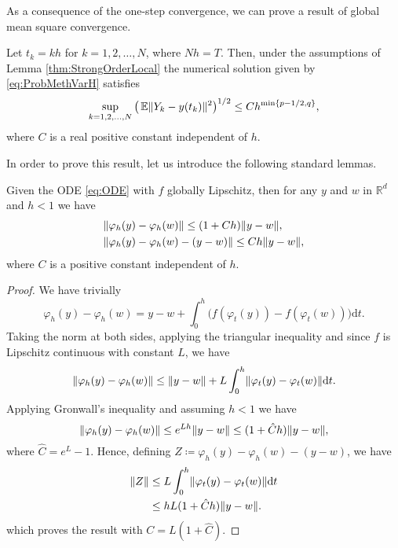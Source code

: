 \documentclass{siamart1116}
\numberwithin{theorem}{section}
\DeclarePairedDelimiter{\norm}{\|}{\|}
\renewcommand{\phi}{\varphi}
\newcommand{\R}{\mathbb{R}}
\newcommand{\defeq}{\coloneqq}
\newcommand{\E}{\operatorname{\mathbb{E}}}
\newcommand{\dd}{\mathrm{d}}
\newcommand{\corr}[1]{{\color{bordeaux}#1}}
\begin{document}
As a consequence of the one-step convergence, we can prove a result of global mean square convergence.
\begin{theorem}\label{thm:StrongOrder} Let $t_k = kh$ for $k = 1, 2, \ldots, N$, where $Nh = T$. Then, under the assumptions of Lemma \ref{thm:StrongOrderLocal} the numerical solution given by \eqref{eq:ProbMethVarH} satisfies 
	\corr{\begin{equation}\label{eq:StrongGlobalClaim}
		\sup_{k=1,2, \ldots, N} \big(\E\norm{Y_k - y(t_k)}^2\big)^{1/2} \leq C h^{\min\{p-1/2, q\}},
	\end{equation}}
	where $C$ is a real positive constant independent of $h$. 
\end{theorem}
In order to prove this result, let us introduce the following standard lemmas.
\corr{\begin{lemma}\label{lem:ODERepresentation} Given the ODE \eqref{eq:ODE} with $f$ globally Lipschitz, then for any $y$ and $w$ in $\R^d$ and $h < 1$ we have
	\begin{align}
		&\norm{\phi_h(y) - \phi_h(w)} \leq (1 + Ch) \norm{y - w},\\
		&\norm{\phi_h(y) - \phi_h(w) - (y - w)} \leq Ch\norm{y - w},
	\end{align}
	where $C$ is a positive constant independent of $h$.
\end{lemma}}
\begin{proof} We have trivially
	\begin{equation}
		\phi_h(y) - \phi_h(w) = y - w + \int_{0}^{h}\big(f(\phi_t(y)) - f(\phi_t(w))\big) \dd t.
	\end{equation}
	Taking the norm at both sides, applying the triangular inequality and since $f$ is Lipschitz continuous with constant $L$, we have
	\begin{equation}
		\norm{\phi_h(y) - \phi_h(w)} \leq \norm{y - w} + L\int_{0}^{h}\norm{\phi_t(y) - \phi_t(w)} \dd t.
	\end{equation}
	Applying Gronwall's inequality and assuming $h < 1$ we have
	\begin{equation}
		\norm{\phi_h(y) - \phi_h(w)} \leq e^{Lh} \norm{y - w}  \leq (1 + \hat C h) \norm{y - w},
	\end{equation}
	where $\hat C = e^L - 1$. Hence, defining $Z \defeq \phi_h(y) - \phi_h(w) - (y - w)$, we have
	\begin{equation}
	\begin{aligned}
		\norm{Z} &\leq L\int_{0}^{h} \norm{\phi_t(y) - \phi_t(w)} \dd t\\
		&\leq h L(1 + \hat C h) \norm{y - w}.
	\end{aligned}
	\end{equation}
	which proves the result with $C = L(1 + \hat C)$.	
\end{proof}
\end{document}
